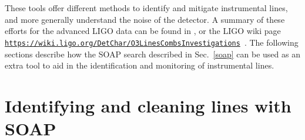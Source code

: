 \begin{description}
	
\end{description}


These tools offer different methods to identify and mitigate instrumental lines, and more generally understand the noise of the detector. A summary of these efforts for
the advanced \gls{LIGO} data can be found in
\citep{covas2018IdentificationMitigation}, or the \gls{LIGO} wiki page {\tt
\url{https://wiki.ligo.org/DetChar/O3LinesCombsInvestigations}}~. The following
sections describe how the SOAP search described in Sec.~\ref{soap} can be used
as an extra tool to aid in the identification and monitoring of instrumental
lines.

\clearpage

\section{\label{detchar:soap}Identifying and cleaning lines with SOAP}

